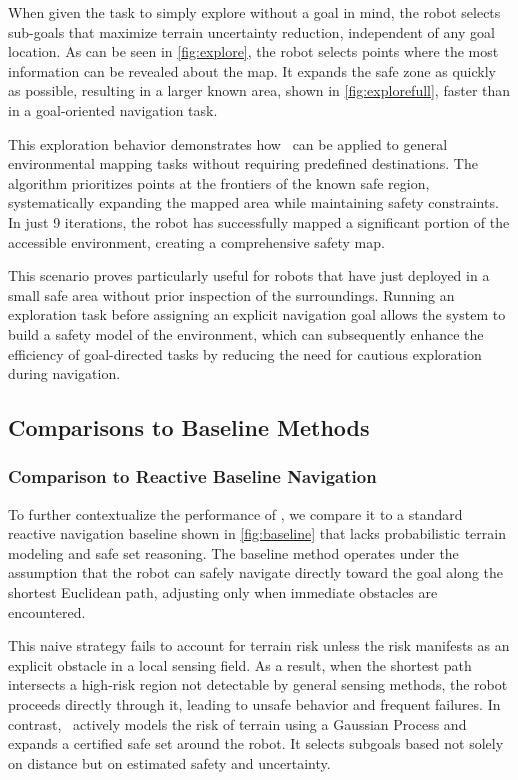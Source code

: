 When given the task to simply explore without a goal in mind, the robot selects sub-goals that maximize terrain uncertainty reduction, independent of any goal location. As can be seen in \autoref{fig:explore}, the robot selects points where the most information can be revealed about the map. It expands the safe zone as quickly as possible, resulting in a larger known area, shown in \autoref{fig:explorefull}, faster than in a goal-oriented navigation task. 

This exploration behavior demonstrates how \algoname\ can be applied to general environmental mapping tasks without requiring predefined destinations. The algorithm prioritizes points at the frontiers of the known safe region, systematically expanding the mapped area while maintaining safety constraints. In just 9 iterations, the robot has successfully mapped a significant portion of the accessible environment, creating a comprehensive safety map.

This scenario proves particularly useful for robots that have just deployed in a small safe area without prior inspection of the surroundings. Running an exploration task before assigning an explicit navigation goal allows the system to build a safety model of the environment, which can subsequently enhance the efficiency of goal-directed tasks by reducing the need for cautious exploration during navigation.

\subsection{Comparisons to Baseline Methods}

\subsubsection{Comparison to Reactive Baseline Navigation}

To further contextualize the performance of \algoname, we compare it to a standard reactive navigation baseline shown in \autoref{fig:baseline} that lacks probabilistic terrain modeling and safe set reasoning. The baseline method operates under the assumption that the robot can safely navigate directly toward the goal along the shortest Euclidean path, adjusting only when immediate obstacles are encountered.

This naive strategy fails to account for terrain risk unless the risk manifests as an explicit obstacle in a local sensing field. As a result, when the shortest path intersects a high-risk region not detectable by general sensing methods, the robot proceeds directly through it, leading to unsafe behavior and frequent failures. In contrast, \algoname\ actively models the risk of terrain using a Gaussian Process and expands a certified safe set around the robot. It selects subgoals based not solely on distance but on estimated safety and uncertainty.

